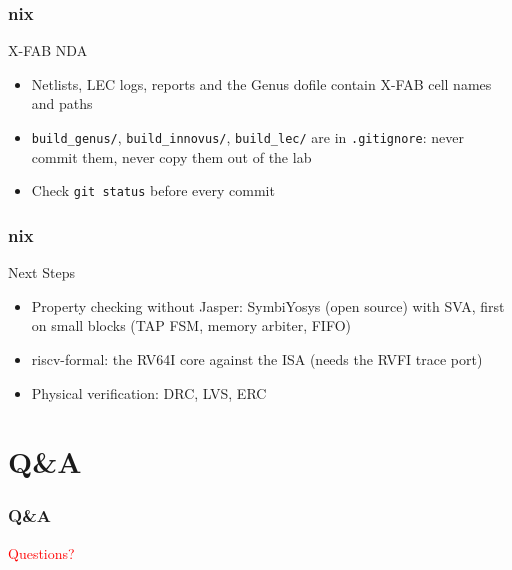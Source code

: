 \documentclass{beamer}
\newcommand{\astitle}{nix}
\newcommand{\assubtitle}{nix}
\newcommand{\cmd}[1]{\texttt{#1}}
\begin{document}
\renewcommand{\assubtitle}{X-FAB NDA}
\begin{frame}
\frametitle{\astitle}
\begin{block}{\assubtitle}
  \begin{itemize}
    \item Netlists, LEC logs, reports and the Genus dofile contain X-FAB
      cell names and paths
    \item \cmd{build\_genus/}, \cmd{build\_innovus/}, \cmd{build\_lec/}
      are in \cmd{.gitignore}: never commit them, never copy them out of
      the lab
    \item Check \cmd{git status} before every commit
  \end{itemize}
\end{block}
\end{frame}

\renewcommand{\assubtitle}{Next Steps}
\begin{frame}
\frametitle{\astitle}
\begin{block}{\assubtitle}
  \begin{itemize}
    \item Property checking without Jasper: SymbiYosys (open source) with
      SVA, first on small blocks (TAP FSM, memory arbiter, FIFO)
    \item riscv-formal: the RV64I core against the ISA (needs the RVFI
      trace port)
    \item Physical verification: DRC, LVS, ERC
  \end{itemize}
\end{block}
\end{frame}

\section{Q\&A}
\renewcommand{\astitle}{Q\&A}
\begin{frame}
\frametitle{\astitle}
\vfill
\centering
\begin{Huge}\textcolor{red}{Questions?}\end{Huge}
\vfill
\end{frame}
\end{document}
